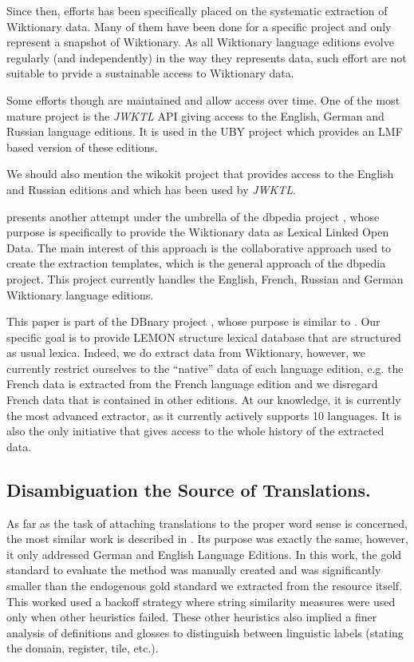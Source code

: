 \documentclass[10pt, a4paper]{article}
\begin{document}
Since then, efforts has been specifically placed on the systematic extraction of Wiktionary data. Many of them have been done for a specific project and only represent a snapshot of Wiktionary. As all Wiktionary language editions evolve regularly (and independently) in the way they represents data, such effort are not suitable to prvide a sustainable access to Wiktionary data. 

Some efforts though are maintained and allow access over time. One of the most mature project is the \emph{JWKTL} API \cite{ZeschMuellerGurevych2008} giving access to  the English, German and Russian language editions. It is used in the UBY project \cite{gurevych2012uby} which provides an LMF based version of these editions. 

We should also mention the wikokit project \cite{krizhanovsky2010transformation} that provides access to the English and Russian editions and which has been used by \emph{JWKTL}.

\cite{HellmannSebastianandBrekleJonasandAuer} presents another attempt under the umbrella of the dbpedia project \cite{dbpedia-swj}, whose purpose is specifically to provide the Wiktionary data as Lexical Linked Open Data. The main interest of this approach is the collaborative approach used to create the extraction templates, which is the general approach of the dbpedia project. This project currently handles the English, French, Russian and German Wiktionary language editions.

This paper is part of the DBnary project \cite{serasset:dbnary-swj}, whose purpose is similar to \cite{HellmannSebastianandBrekleJonasandAuer}. Our specific goal is to provide LEMON structure lexical database that are structured as usual lexica. Indeed, we do extract data from Wiktionary, however, we currently restrict ourselves to the ``native'' data of each language edition, e.g. the French data is extracted from the French language edition and we disregard French data that is contained in other editions. At our knowledge, it is currently the most advanced extractor, as it currently actively supports 10 languages. It is also the only initiative that gives access to the whole history of the extracted data.

\subsection{Disambiguation the Source of Translations.} 

As far as the task of attaching translations to the proper word sense is concerned, the most similar work is described in \cite{meyer-gurevych:2012:PAPERS}. Its purpose was exactly the same, however, it only addressed German and English Language Editions. In this work, the gold standard to evaluate the method was manually created and was significantly smaller than the endogenous gold standard we extracted from the resource itself. This worked used a backoff strategy where string similarity measures were used only when other heuristics failed. These other heuristics also implied a finer analysis of definitions and glosses to distinguish between linguistic labels (stating the domain, register, tile, etc.).
\end{document}
